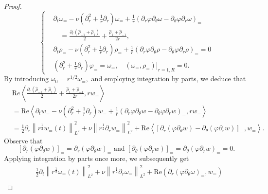 \documentclass[final, 12pt,reqno]{amsart}
\numberwithin{equation}{section}
\begin{document}
\begin{proof}
\begin{equation}\label{6.19}
    \left\{
    \begin{aligned}
        &   \partial_t \omega_{=}-\nu\left(\partial_r^2+\frac{1}{r} \partial_r \right) \omega_{=}+\frac{1}{r}\left(\partial_r \varphi \partial_\theta \omega-\partial_\theta \varphi \partial_r \omega\right)_{=}\\
        &\quad=\frac{\partial_{r}(\hat{\rho}_{-1}+\hat{\rho}_{1})}{2}+ \frac{\hat{\rho}_{1}+\hat{\rho}_{-1}}{2r},\\
        &   \partial_t \rho_{=}-\nu\left(\partial_r^2+\frac{1}{r} \partial_r \right) \rho_{=}+\frac{1}{r}\left(\partial_r \varphi \partial_\theta \rho-\partial_\theta \varphi \partial_r \rho\right)_{=}=0\\
        &   \left(\partial_r^2+\frac{1}{r} \partial_r\right) \varphi_{=}=\omega_{=},\left.\quad (\omega_{=},\rho_{=})\right|_{r=1, R}=0.
    \end{aligned}
    \right.
\end{equation}
By introducing $\omega_0=r^{1/2}\omega_{=},$ and employing integration by parts, we deduce that
$$
\begin{aligned}
&\text{R}e\left\langle\frac{\partial_{r}(\hat{\rho}_{-1}+\hat{\rho}_{1})}{2}+ \frac{\hat{\rho}_{1}+\hat{\rho}_{-1}}{2r},r w_=\right\rangle\\
&=\text{Re}\left\langle\partial_t w_=-\nu\left(\partial_r^2+\frac{1}{r} \partial_r\right) w_=+\frac{1}{r}\left(\partial_r \varphi \partial_\theta w-\partial_\theta \varphi \partial_r w\right)_=, r w_=\right\rangle \\
& =\frac{1}{2} \partial_r\left\|r^{\frac{1}{2}} w_=(t)\right\|_{L^2}^2+\nu\left\|r^{\frac{1}{2}} \partial_r w_=\right\|_{L^2}^2+\text{Re}\left\langle\left[\partial_r\left(\varphi \partial_\theta w\right)-\partial_\theta\left(\varphi \partial_r w\right)\right]_=, w_=\right\rangle .
\end{aligned}
$$
Observe that
$$
\left[\partial_r\left(\varphi \partial_\theta w\right)\right]_==\partial_r\left(\varphi \partial_\theta w\right)_=\text { and }\left[\partial_\theta\left(\varphi \partial_r w\right)\right]_==\partial_\theta\left(\varphi \partial_r w\right)_==0 .
$$
Applying integration by parts once more, we subsequently get
$$
\begin{aligned}
& \frac{1}{2} \partial_t\left\|r^{\frac{1}{2}} \omega_=(t)\right\|_{L^2}^2+\nu\left\|r^{\frac{1}{2}} \partial_r \omega_=\right\|_{L^2}^2+\text{Re}\left(\partial_r\left(\varphi \partial_\theta \omega\right)_=, w_=\right) \\

\end{aligned}$$
\end{proof}
\end{document}
